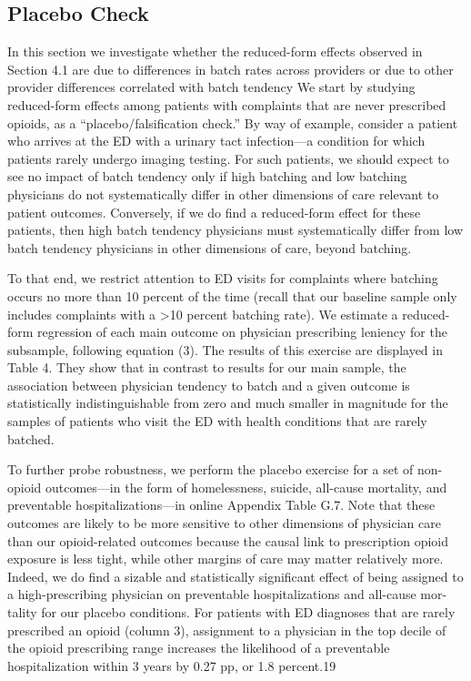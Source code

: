 \documentclass[,,nonblindrev]{informs}
\begin{document}
\hypertarget{placebo-check}{%
\subsection{Placebo Check}\label{placebo-check}}

In this section we investigate whether the reduced-form effects observed
in Section 4.1 are due to differences in batch rates across providers or
due to other provider differences correlated with batch tendency We
start by studying reduced-form effects among patients with complaints
that are never prescribed opioids, as a ``placebo/falsification check.''
By way of example, consider a patient who arrives at the ED with a
urinary tact infection---a condition for which patients rarely undergo
imaging testing. For such patients, we should expect to see no impact of
batch tendency only if high batching and low batching physicians do not
systematically differ in other dimensions of care relevant to patient
outcomes. Conversely, if we do find a reduced-form effect for these
patients, then high batch tendency physicians must systematically differ
from low batch tendency physicians in other dimensions of care, beyond
batching.

To that end, we restrict attention to ED visits for complaints where
batching occurs no more than 10 percent of the time (recall that our
baseline sample only includes complaints with a \textgreater10 percent
batching rate). We estimate a reduced-form regression of each main
outcome on physician prescribing leniency for the subsample, following
equation (3). The results of this exercise are displayed in Table 4.
They show that in contrast to results for our main sample, the
association between physician tendency to batch and a given outcome is
statistically indistinguishable from zero and much smaller in magnitude
for the samples of patients who visit the ED with health conditions that
are rarely batched.

To further probe robustness, we perform the placebo exercise for a set
of non-opioid outcomes---in the form of homelessness, suicide, all-cause
mortality, and preventable hospitalizations---in online Appendix Table
G.7. Note that these outcomes are likely to be more sensitive to other
dimensions of physician care than our opioid-related outcomes because
the causal link to prescription opioid exposure is less tight, while
other margins of care may matter relatively more. Indeed, we do find a
sizable and statistically significant effect of being assigned to a
high-prescribing physician on preventable hospitalizations and all-cause
mor- tality for our placebo conditions. For patients with ED diagnoses
that are rarely prescribed an opioid (column 3), assignment to a
physician in the top decile of the opioid prescribing range increases
the likelihood of a preventable hospitalization within 3 years by 0.27
pp, or 1.8 percent.19
\end{document}
